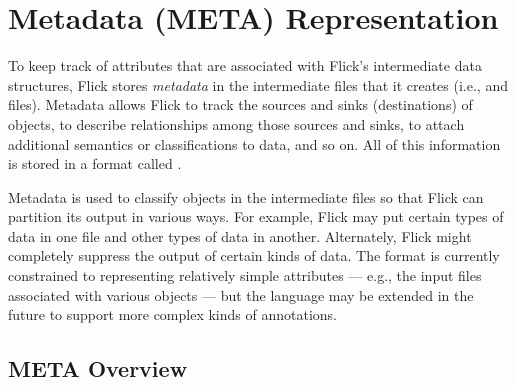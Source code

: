 

\chapter{Metadata (META) Representation}
\label{cha:META}

To keep track of attributes that are associated with Flick's intermediate data
structures, Flick stores \emph{metadata} in the intermediate files that it
creates (i.e., \AOI{} and \PRESC{} files).  Metadata allows Flick to track the
sources and sinks (destinations) of objects, to describe relationships among
those sources and sinks, to attach additional semantics or classifications to
data, and so on.  All of this information is stored in a format called
\META{}\@.

Metadata is used to classify objects in the intermediate files so that Flick
can partition its output in various ways.  For example, Flick may put certain
types of data in one file and other types of data in another.  Alternately,
Flick might completely suppress the output of certain kinds of data.  The
\META{} format is currently constrained to representing relatively simple
attributes --- e.g., the input files associated with various objects --- but
the \META{} language may be extended in the future to support more complex
kinds of annotations.



\section{META Overview}
\label{sec:META:META Overview}

